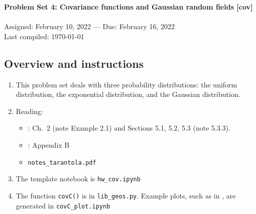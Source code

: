\documentclass[11pt,titlepage,fleqn]{article}
\newcommand{\tfile}{{\tt hw\_cov.ipynb}}
\begin{document}

\begin{spacing}{1.2}
\centering
{\large \bf Problem Set 4: Covariance functions and Gaussian random fields [cov]} \\
\cltag\ \\
Assigned: February 10, 2022 --- Due: February 16, 2022 \\
Last compiled: \today
\end{spacing}


\subsection*{Overview and instructions}

\begin{enumerate}
\item This problem set deals with three probability distributions: the uniform distribution, the exponential distribution, and the Gaussian distribution.

\item Reading:
\begin{itemize}
\item \citet{Tarantola2005}: Ch.~2 (note Example 2.1) and Sections 5.1, 5.2, 5.3 (note 5.3.3).
\item \citet{Aster}: Appendix B
\item \verb+notes_tarantola.pdf+
\end{itemize}

\item The template notebook is \tfile
\item The function \verb+covC()+ is in \verb+lib_geos.py+. Example plots, such as in , are generated in \verb+covC_plot.ipynb+
\end{enumerate}

\end{document}
